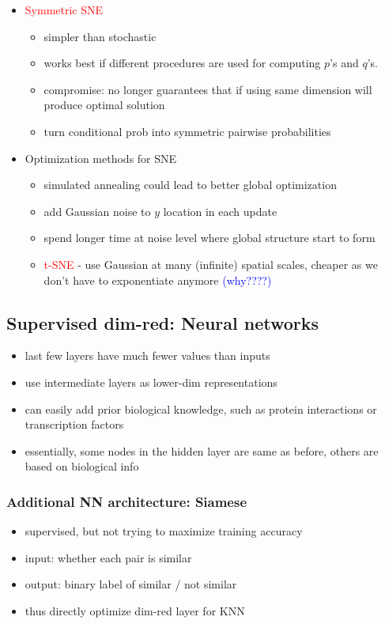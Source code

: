 \documentclass[font=12pt]{article}
\begin{document}
\begin{itemize}
\begin{itemize}
			\end{itemize}
		\item \textcolor{red}{Symmetric SNE}
			\begin{itemize}
				\item simpler than stochastic
				\item works best if different procedures are used for computing $p$'s and  $q$'s.
				\item compromise: no longer guarantees that if using same dimension will produce optimal solution
				\item turn conditional prob into symmetric pairwise probabilities
			\end{itemize}
		\item Optimization methods for SNE
			\begin{itemize}
				\item simulated annealing could lead to better global optimization
				\item add Gaussian noise to $y$ location in each update
				\item spend longer time at noise level where global structure start to form
				\item \textcolor{red}{t-SNE} - use Gaussian at many (infinite) spatial scales, cheaper as we don't have to exponentiate anymore \textcolor{blue}{(why????)} 
			\end{itemize}
				\end{itemize}
\subsection{Supervised dim-red: Neural networks}
\begin{itemize}
	\item last few layers have much fewer values than inputs
	\item use intermediate layers as lower-dim representations
	\item can easily add prior biological knowledge, such as protein interactions or transcription factors
	\item essentially, some nodes in the hidden layer are same as before, others are based on biological info
\end{itemize}
\subsubsection{Additional NN architecture: Siamese}
\begin{itemize}
	\item supervised, but not trying to maximize training accuracy
	\item input: whether each pair is similar
	\item output: binary label of similar / not similar
	\item thus directly optimize dim-red layer for KNN
\end{itemize}
\newpage
\end{document}
